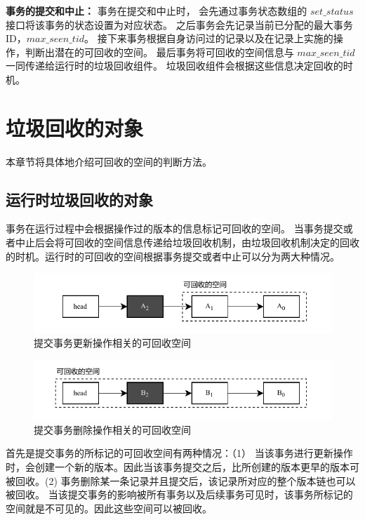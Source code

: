 \textbf{事务的提交和中止：} 事务在提交和中止时，
会先通过事务状态数组的 $set\_status$ 接口将该事务的状态设置为对应状态。
之后事务会先记录当前已分配的最大事务 ID，$max\_seen\_tid$。
接下来事务根据自身访问过的记录以及在记录上实施的操作，判断出潜在的可回收的空间。
最后事务将可回收的空间信息与 $max\_seen\_tid$ 一同传递给运行时的垃圾回收组件。
垃圾回收组件会根据这些信息决定回收的时机。


\section{垃圾回收的对象}
\label{sec:space}

本章节将具体地介绍可回收的空间的判断方法。

\subsection{运行时垃圾回收的对象}

事务在运行过程中会根据操作过的版本的信息标记可回收的空间。
当事务提交或者中止后会将可回收的空间信息传递给垃圾回收机制，由垃圾回收机制决定的回收的时机。运行时的可回收的空间根据事务提交或者中止可以分为两大种情况。

\begin{figure}
    \centering
    \includegraphics[width=1\linewidth]{figures/gc-a.pdf}
    \caption{提交事务更新操作相关的可回收空间}
    \label{fig:space-commit}
\end{figure}

\begin{figure}
    \centering
    \includegraphics[width=1\linewidth]{figures/gc-b.pdf}
    \caption{提交事务删除操作相关的可回收空间}
    \label{fig:space-commit2}
\end{figure}

首先是提交事务的所标记的可回收空间有两种情况：（1） 当该事务进行更新操作时，会创建一个新的版本。因此当该事务提交之后，比所创建的版本更早的版本可被回收。(2) 事务删除某一条记录并且提交后，该记录所对应的整个版本链也可以被回收。 当该提交事务的影响被所有事务以及后续事务可见时，该事务所标记的空间就是不可见的。因此这些空间可以被回收。


